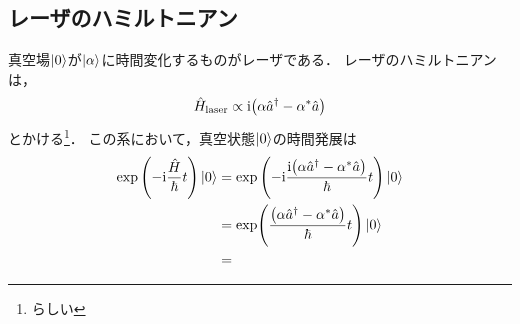 \documentclass{report}
\begin{document}
  \subsection{レーザのハミルトニアン}
    真空場$\ket{0}$が$\ket{\alpha}$に時間変化するものがレーザである．
    レーザのハミルトニアンは，
    \begin{align}
      \hat{H}_{\mathrm{laser}} \propto \mathrm{i}\qty(\alpha\hat{a}^{\dag} - \alpha^*\hat{a})
    \end{align}
    とかける\footnote{らしい}．
    この系において，真空状態$\ket{0}$の時間発展は
    \begin{align}
      \exp\qty(-\mathrm{i}\frac{\hat{H}}{\hbar}t)\ket{0} &= \exp\qty(-\mathrm{i}\frac{\mathrm{i}\qty(\alpha\hat{a}^{\dag} - \alpha^*\hat{a})}{\hbar}t)\ket{0} \\ 
      &= \exp(\frac{\qty(\alpha\hat{a}^{\dag} - \alpha^*\hat{a})}{\hbar}t)\ket{0} \\ 
      &= 
    \end{align}
\end{document}
